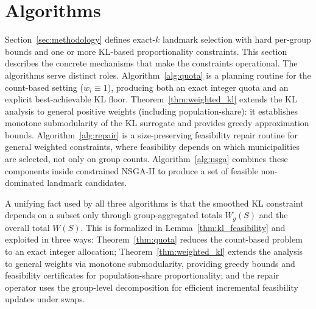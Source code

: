 \documentclass[10pt,journal]{IEEEtran}
\newcommand{\1}{\mathbf{1}}
\theoremstyle{ieeethm}
\begin{document}
\section{Algorithms}
\label{sec:algorithms}

\begingroup


\algrenewcommand{}
\algrenewcommand{}

\algnewcommand{}
\algnewcommand{}

\algnewcommand\Break{\State \algorithmicbreak}
\algnewcommand\Continue{\State \algorithmiccontinue}

Section~\ref{sec:methodology} defines exact-$k$ landmark selection with hard per-group bounds and one or more KL-based
proportionality constraints. This section describes the concrete mechanisms that make the constraints operational.
The algorithms serve distinct roles. Algorithm~\ref{alg:quota} is a planning routine for the count-based setting
($w_i\equiv 1$), producing both an exact integer quota and an explicit best-achievable KL floor.
Theorem~\ref{thm:weighted_kl} extends the KL analysis to general positive weights (including population-share):
it establishes monotone submodularity of the KL surrogate and provides greedy approximation bounds.
Algorithm~\ref{alg:repair} is a size-preserving feasibility repair routine for general weighted constraints,
where feasibility depends on which municipalities are selected, not only on group counts.
Algorithm~\ref{alg:nsga} combines these components inside constrained NSGA-II to produce a set of feasible
non-dominated landmark candidates.

A unifying fact used by all three algorithms is that the smoothed KL constraint depends on a subset only through
group-aggregated totals $W_g(S)$ and the overall total $W(S)$. This is formalized in
Lemma~\ref{thm:kl_feasibility} and exploited in three ways:
Theorem~\ref{thm:quota} reduces the count-based problem to an exact integer allocation;
Theorem~\ref{thm:weighted_kl} extends the analysis to general weights via monotone submodularity,
providing greedy bounds and feasibility certificates for population-share proportionality;
and the repair operator uses the group-level decomposition for efficient incremental feasibility
updates under swaps.
\end{document}
